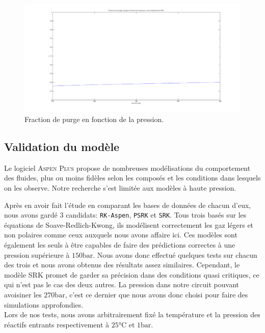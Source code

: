 \documentclass[a4paper, oneside, 12pt]{article}
\begin{document}
\begin{figure}[h!]
	\begin{center}
		\includegraphics[scale=0.3]{purge2.png}
	\end{center}
	\caption{Fraction de purge en fonction de la pression.}
	\label{fig:purge1}
\end{figure}


\subsection{Validation du modèle}

Le logiciel \textsc{Aspen Plus} propose de nombreuses 
modélisations du comportement des fluides, 
plus ou moins fidèles selon les composés et 
les conditions dans lesquels on les observe. 
Notre recherche s'est limitée aux modèles à haute pression. 

Après en avoir fait l'étude en comparant les bases de données de chacun d'eux, 
nous avons gardé 3 candidats: \texttt{RK-Aspen}, \texttt{PSRK} et \texttt{SRK}. 
Tous trois basés sur les équations de Soave-Redlich-Kwong, 
ils modélisent correctement les gaz légers et non polaires 
comme ceux auxquels nous avons affaire ici. 
Ces modèles sont également les seuls à être capables de faire 
des prédictions correctes à une pression supérieure à $150\si{\bar}$. 
Nous avons donc effectué quelques tests sur chacun des trois 
et nous avons obtenus des résultats assez similaires.
Cependant, le modèle SRK promet de garder sa précision dans des conditions 
quasi critiques, ce qui n'est pas le cas des deux autres. 
La pression dans notre circuit pouvant avoisiner les $270\si{\bar}$, 
c'est ce dernier que nous avons donc choisi pour faire des simulations approfondies.\\
Lors de nos tests, nous avons arbitrairement fixé la température et 
la pression des réactifs entrants respectivement à $25\si{\degreeCelsius}$ et $1\si{\bar}$.
\end{document}
